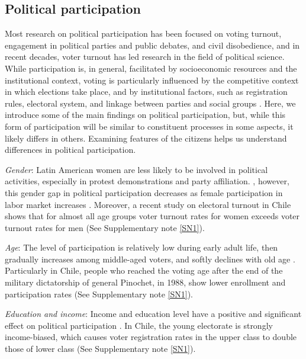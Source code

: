 \documentclass[onecolumn]{article}
\begin{document}
\subsection*{Political participation}

Most research on political participation has been focused on voting turnout,  engagement in political parties and public debates, and civil disobedience, and in recent decades, voter turnout has led research in the field of political science. While participation is, in general, facilitated by socioeconomic resources and the institutional context, voting is particularly influenced by the competitive context in which elections take place, and by institutional factors, such as registration rules, electoral system, and linkage between parties and social groups \cite{powell}. Here, we introduce some of the main findings on political participation, but, while this form of participation will be similar to constituent processes in some aspects, it likely differs in others. Examining features of the citizens helps us understand differences in political participation.

\textit{Gender}: Latin American women are less likely to be involved in political activities, especially in  protest demonstrations and party affiliation. \cite{pachon2012, schlozman1999}, however, this gender gap in political participation decreases as female participation in labor market increases \cite{schlozman1999}. Moreover, a recent study on electoral turnout in Chile shows that for almost all age groups voter turnout rates for women exceeds voter turnout rates for men \cite{pnud} (See Supplementary note \ref{SN1}).



\textit{Age}: The level of participation is relatively low during early adult life, then gradually increases among middle-aged voters, and softly declines with old age \cite{wolfinger1980}. Particularly in Chile, people who reached the voting age after the end of the military dictatorship of general Pinochet, in 1988, show lower enrollment and participation rates \cite{contreras} (See Supplementary note \ref{SN1}).  


\textit{Education and income}: Income and education level have a positive and significant effect on political participation \cite{verba, pnud}. In Chile, the young electorate is strongly income-biased, which causes voter registration rates in the upper class to double those of lower class \cite{corvalan} (See Supplementary note \ref{SN1}).
\end{document}
